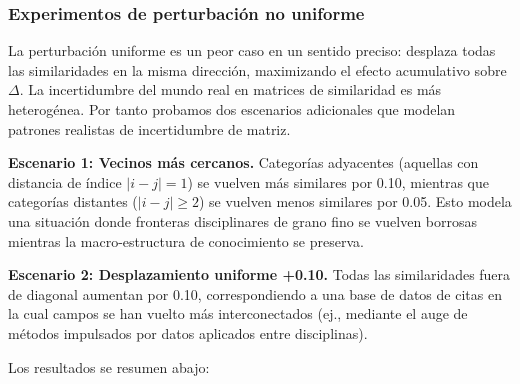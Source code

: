 \documentclass[
]{article}
\begin{document}
\hypertarget{experimentos-de-perturbaciuxf3n-no-uniforme}{%
\subsubsection{Experimentos de perturbación no
uniforme}\label{experimentos-de-perturbaciuxf3n-no-uniforme}}

La perturbación uniforme es un peor caso en un sentido preciso: desplaza
todas las similaridades en la misma dirección, maximizando el efecto
acumulativo sobre \(\Delta\). La incertidumbre del mundo real en
matrices de similaridad es más heterogénea. Por tanto probamos dos
escenarios adicionales que modelan patrones realistas de incertidumbre
de matriz.

\textbf{Escenario 1: Vecinos más cercanos.} Categorías adyacentes
(aquellas con distancia de índice \(|i - j| = 1\)) se vuelven más
similares por 0.10, mientras que categorías distantes
(\(|i - j| \ge 2\)) se vuelven menos similares por 0.05. Esto modela una
situación donde fronteras disciplinares de grano fino se vuelven
borrosas mientras la macro-estructura de conocimiento se preserva.

\textbf{Escenario 2: Desplazamiento uniforme +0.10.} Todas las
similaridades fuera de diagonal aumentan por 0.10, correspondiendo a una
base de datos de citas en la cual campos se han vuelto más
interconectados (ej., mediante el auge de métodos impulsados por datos
aplicados entre disciplinas).

Los resultados se resumen abajo:
\end{document}
